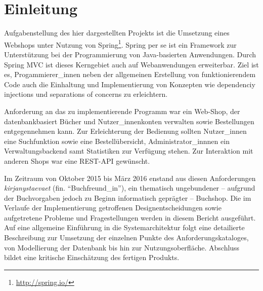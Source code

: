 \section{Einleitung}
	Aufgabenstellung des hier dargestellten Projekts ist die Umsetzung eines Webshops unter Nutzung von Spring\footnote{\hyperlink{http://spring.io/}{http://spring.io/}}. Spring per se ist ein Framework zur Unterstützung bei der Programmierung von Java-basierten Anwendungen. Durch Spring MVC ist dieses Kerngebiet auch auf Webanwendungen erweiterbar. Ziel ist es, Progammierer\_innen neben der allgemeinen Erstellung von funktionierendem Code auch die Einhaltung und Implementierung von Konzepten wie dependenciy injections und separations of concerns zu erleichtern. 
	
	Anforderung an das zu implementierende Programm war ein Web-Shop, der datenbankbasiert Bücher und Nutzer\_innenkonten verwalten sowie Bestellungen entgegennehmen kann. Zur Erleichterung der Bedienung sollten Nutzer\_innen eine Suchfunktion sowie eine Bestellübersicht, Administrator\_innnen ein Verwaltungsbackend samt Statistiken zur Verfügung stehen. Zur Interaktion mit anderen Shops war eine REST-API gewünscht.
	
	Im Zeitraum von Oktober 2015 bis März 2016 enstand aus diesen Anforderungen \textit{kirjanystaevaet} (fin. "`Buchfreund\_in"'), ein thematisch ungebundener -- aufgrund der Buchvorgaben jedoch zu Beginn informatisch geprägter -- Buchshop. Die im Verlaufe der Implementierung getroffenen Designentscheidungen sowie aufgetretene Probleme und Fragestellungen werden in diesem Bericht ausgeführt. Auf eine allgemeine Einführung in die Systemarchitektur folgt eine detailierte Beschreibung zur Umsetzung der einzelnen Punkte des Anforderungskataloges, von Modellierung der Datenbank bis hin zur Nutzungsoberfläche. Abschluss bildet eine kritische Einschätzung des fertigen Produkts. 